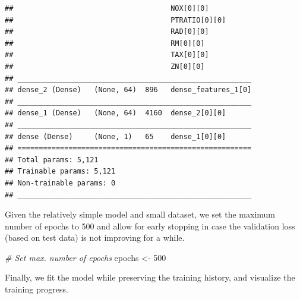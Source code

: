 \documentclass[
  12pt,
]{style/krantz}
\newenvironment{Shaded}{\begin{snugshade}}{\end{snugshade}}
\newcommand{\AttributeTok}[1]{\textcolor[rgb]{0.77,0.63,0.00}{#1}}
\newcommand{\CommentTok}[1]{\textcolor[rgb]{0.56,0.35,0.01}{\textit{#1}}}
\newcommand{\DecValTok}[1]{\textcolor[rgb]{0.00,0.00,0.81}{#1}}
\newcommand{\FloatTok}[1]{\textcolor[rgb]{0.00,0.00,0.81}{#1}}
\newcommand{\FunctionTok}[1]{\textcolor[rgb]{0.00,0.00,0.00}{#1}}
\newcommand{\NormalTok}[1]{#1}
\newcommand{\OtherTok}[1]{\textcolor[rgb]{0.56,0.35,0.01}{#1}}
\newcommand{\SpecialCharTok}[1]{\textcolor[rgb]{0.00,0.00,0.00}{#1}}
\begin{document}
\begin{verbatim}
##                                     NOX[0][0]          
##                                     PTRATIO[0][0]      
##                                     RAD[0][0]          
##                                     RM[0][0]           
##                                     TAX[0][0]          
##                                     ZN[0][0]           
## _______________________________________________________
## dense_2 (Dense)   (None, 64)  896   dense_features_1[0]
## _______________________________________________________
## dense_1 (Dense)   (None, 64)  4160  dense_2[0][0]      
## _______________________________________________________
## dense (Dense)     (None, 1)   65    dense_1[0][0]      
## =======================================================
## Total params: 5,121
## Trainable params: 5,121
## Non-trainable params: 0
## _______________________________________________________
\end{verbatim}

Given the relatively simple model and small dataset, we set the maximum number of epochs to 500 and allow for early stopping in case the validation loss (based on test data) is not improving for a while.

\begin{Shaded}
\begin{Highlighting}[]
\CommentTok{\# Set max. number of epochs}
\NormalTok{epochs }\OtherTok{\textless{}{-}} \DecValTok{500}
\end{Highlighting}
\end{Shaded}

Finally, we fit the model while preserving the training history, and visualize the training progress.

\begin{Shaded}
\end{Shaded}
\end{document}
